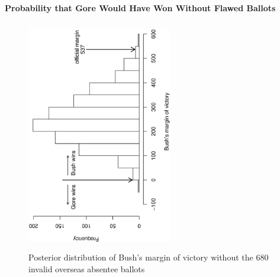 \documentclass[landscape,letterpaper]{seminar}
\begin{document}

\begin{slide}
\centerline{\textbf{\small Probability that Gore Would Have Won Without Flawed Ballots}}

\begin{figure}
\begin{center}
\includegraphics[width=2.5in,height=4in,angle=-90]{margin}
\caption{\small Posterior distribution of Bush's margin of victory without the
  680 invalid overseas absentee ballots} \label{fg:margin}
\end{center} 
\end{figure}
\end{slide}

\end{document}
